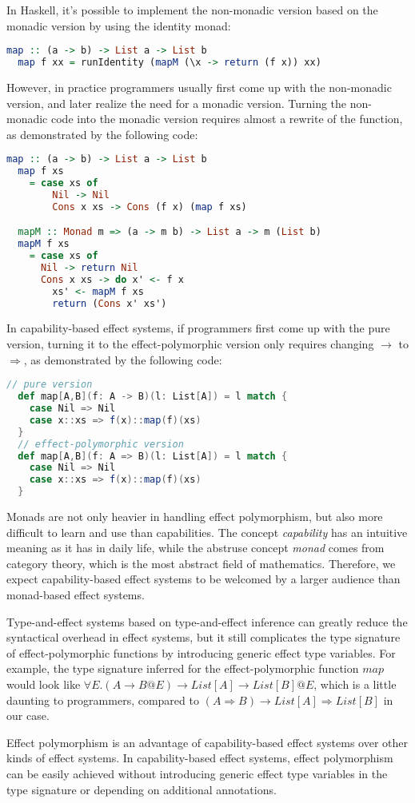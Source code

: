 In Haskell, it's possible to implement the non-monadic version based
on the monadic version by using the identity monad:

\begin{lstlisting}[language=Haskell]
  map :: (a -> b) -> List a -> List b
  map f xx = runIdentity (mapM (\x -> return (f x)) xx)
\end{lstlisting}

However, in practice programmers usually first come up with the
non-monadic version, and later realize the need for a monadic
version. Turning the non-monadic code into the monadic version
requires almost a rewrite of the function, as demonstrated by the
following code:

\begin{lstlisting}[language=Haskell]
  map :: (a -> b) -> List a -> List b
  map f xs
    = case xs of
        Nil -> Nil
        Cons x xs -> Cons (f x) (map f xs)

  mapM :: Monad m => (a -> m b) -> List a -> m (List b)
  mapM f xs
    = case xs of
      Nil -> return Nil
      Cons x xs -> do x' <- f x
        xs' <- mapM f xs
        return (Cons x' xs')
\end{lstlisting}

In capability-based effect systems, if programmers first come up with
the pure version, turning it to the effect-polymorphic version only
requires changing $\to$ to $\Rightarrow$, as demonstrated by the
following code:

\begin{lstlisting}[language=Scala]
  // pure version
  def map[A,B](f: A -> B)(l: List[A]) = l match {
    case Nil => Nil
    case x::xs => f(x)::map(f)(xs)
  }
  // effect-polymorphic version
  def map[A,B](f: A => B)(l: List[A]) = l match {
    case Nil => Nil
    case x::xs => f(x)::map(f)(xs)
  }
\end{lstlisting}

Monads are not only heavier in handling effect polymorphism, but also
more difficult to learn and use than capabilities. The concept
\emph{capability} has an intuitive meaning as it has in daily life,
while the abstruse concept \emph{monad} comes from category theory,
which is the most abstract field of mathematics. Therefore, we expect
capability-based effect systems to be welcomed by a larger audience
than monad-based effect systems.

Type-and-effect systems based on type-and-effect
inference\cite{talpin1992polymorphic, talpin1994type} can greatly
reduce the syntactical overhead in effect systems, but it still
complicates the type signature of effect-polymorphic functions by
introducing generic effect type variables. For example, the type
signature inferred for the effect-polymorphic function $map$ would
look like $\forall E.(A \to B @E) \to List[A] \to List[B] @E$, which
is a little daunting to programmers, compared to
$(A \Rightarrow B) \to List[A] \Rightarrow List[B]$ in our case.

Effect polymorphism is an advantage of capability-based effect systems
over other kinds of effect systems. In capability-based effect
systems, effect polymorphism can be easily achieved without
introducing generic effect type variables in the type signature or
depending on additional annotations.
